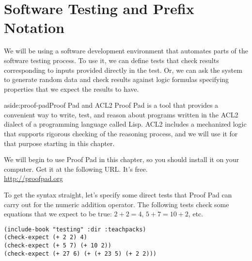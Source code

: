 \chapter{Software Testing and Prefix Notation}
\label{ch:software-testing-prefix-notation}


We will be using a software development environment that automates parts of the software testing process.
To use it, we can define tests that check results corresponding to inputs provided directly in the test.
Or, we can ask the system to generate random data and
check results against logic formulas specifying properties that we expect the results to have.

\begin{aside}{aside:proof-pad}{Proof Pad and ACL2}
Proof Pad is a tool that provides a convenient way
to write, test, and reason about programs
written in the ACL2 dialect of a programming language called Lisp.
ACL2 includes a mechanized logic that
supports rigorous checking of the reasoning process,
and we will use it for that purpose starting in this chapter.

We will begin to use Proof Pad in this chapter,
so you should install it on your computer.
Get it at the following URL. It's free.\\
\hspace*{38mm}\url{http://proofpad.org}
\end{aside}

To get the syntax straight,
let's specify some direct tests that Proof Pad
can carry out for the numeric addition operator.
The following tests check some equations that we expect to be true:
$2 + 2 = 4$, $5 + 7 = 10 + 2$, etc.

\label{testing-include}
\begin{code}
\begin{verbatim}
(include-book "testing" :dir :teachpacks)
(check-expect (+ 2 2) 4)
(check-expect (+ 5 7) (+ 10 2))
(check-expect (+ 27 6) (+ (+ 23 5) (+ 2 2)))
\end{verbatim}
\end{code}

